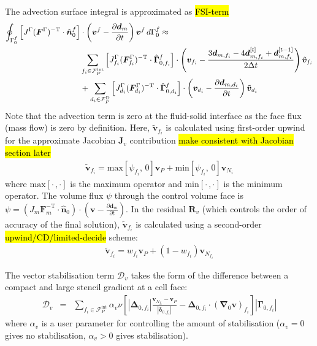 \documentclass[sn-mathphys,Numbered]{sn-jnl}%
\newcommand{\bb}{\boldsymbol}
\begin{document}
The advection surface integral is approximated as \hl{FSI-term}
\begin{align}
	\oint_{\Gamma^f_0}  \left[ J^\Gamma (\bb{F}^\Gamma)^{-\text{T}} \cdot \hat{\bb{n}}_0^f \right]
		& \cdot \left(\bb{v}^f - \frac{\partial \bb{d}_m}{\partial t}\right) \bb{v}^f \, d\Gamma^f_0
		\approx \notag \\
		& \sum_{f_i \in \mathcal{F}_P^{\text{int}}}
	\left[ J^\Gamma_{f_i} (\bb{F}^\Gamma_{f_i})^{-\text{T}} \cdot \hat{\bb{\Gamma}}_{0, f_i}^f \right]
		\cdot \left( \bb{v}_{f_i} - \frac{3 \bb{d}_{m,f_i} - 4 \bb{d}_{m,f_i}^{[t]} + \bb{d}_{m,f_i}^{[t-1]}}{2\Delta t}  \right) \tilde{\bb{v}}_{f_i} \notag \\
	&+ \sum_{d_i \in \mathcal{F}_P^{\text{D}}} \left[ J^\Gamma_{d_i} (\bb{F}^\Gamma_{d_i})^{-\text{T}} \cdot \hat{\bb{\Gamma}}_{0, d_i}^f \right]
		 \cdot \left( \bb{v}_{d_i} - \frac{\partial \bb{d}_{m,d_i}}{\partial t} \right) \tilde{\bb{v}}_{d_i}
\end{align}
Note that the advection term is zero at the fluid-solid interface as the face flux (mass flow) is zero by definition.
Here, $\tilde{\bb{v}}_{f_i}$ is calculated using first-order upwind for the approximate Jacobian $\bb{J}_v$ contribution \hl{make consistent with Jacobian section later}
\begin{eqnarray} \label{eq:advection_velocity_interp}
	\tilde{\bb{v}}_{f_i} =
		\text{max}\left[ \psi_{f_i}, \, 0\right] \bb{v}_P + \text{min}\left[ \psi_{f_i}, \, 0\right] \bb{v}_{N_i}
\end{eqnarray}
where $\text{max}\left[\cdot \,, \cdot \right]$ is the maximum operator and $\text{min}\left[\cdot \,, \cdot \right]$ is the minimum operator.
The volume flux $\psi$ through the control volume face is $\psi = \left( J_m \bb{F}_m^{-\text{T}} \cdot \hat{\bb{n}}_0 \right) \cdot \left(\bb{v} - \frac{\partial \bb{d}_m}{\partial t} \right)$.
In the residual $\bb{R}_v$ (which controls the order of accuracy of the final solution), $\tilde{\bb{v}}_{f_i}$ is calculated using a second-order \hl{upwind/CD/limited-decide} scheme:
\begin{eqnarray}
	\tilde{\bb{v}}_{f_i} =  w_{f_i} \bb{v}_P + (1 - w_{f_i}) \bb{v}_{N_{f_i}}
\end{eqnarray}

The vector stabilisation term $\bb{\mathcal{D}}_v$ takes the form of the difference between a compact and large stencil gradient at a cell face:
\begin{eqnarray}
	\bb{\mathcal{D}}_v
	&=& \sum_{f_i \in \mathcal{F}^{\text{int}}_P} \alpha_v \nu \left[
		\left|\bb{\Delta}_{0,f_i} \right| \frac{ \bb{v}_{N_{f_i}} - \bb{v}_P}{\left|\bb{\delta}_{0,f_i}\right|}	- \bb{\Delta}_{0,f_i} \cdot \left(\bb{\nabla}_0 \bb{v} \right)_{f_i}
		\right]    \left|\bb{\Gamma}_{0,f_i}\right|
\end{eqnarray}
where $\alpha_v$ is a user parameter for controlling the amount of stabilisation ($\alpha_v = 0$ gives no stabilisation, $\alpha_v > 0$ gives stabilisation).
\end{document}
